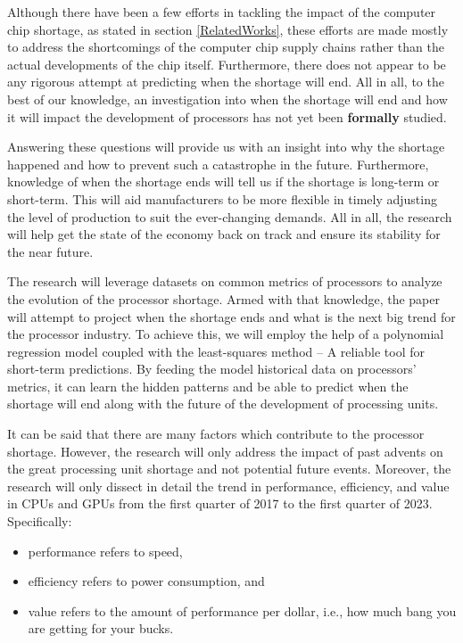 \documentclass[conference]{IEEEtran}
\begin{document}
Although there have been a few efforts in tackling the impact of the
computer chip shortage, as stated in section \ref{RelatedWorks}, these
efforts are made mostly to address the shortcomings of the computer chip
supply chains rather than the actual developments of the chip itself.
Furthermore, there does not appear to be any rigorous attempt at predicting
when the shortage will end. All in all, to the
best of our knowledge, an investigation into when the shortage will end and how
it will impact the development of processors has not yet been \textbf{formally}
studied.

Answering these questions will provide us with an insight into why the
shortage happened and how to prevent such a catastrophe in the future.
Furthermore, knowledge of when the shortage ends will tell us if the
shortage is long-term or short-term. This will aid manufacturers to be
more flexible in timely adjusting the level of production to suit the
ever-changing demands. All in all, the research will help get the state
of the economy back on track and ensure its stability for the near future.

The research will leverage datasets on common metrics of processors to
analyze the evolution of the processor shortage. Armed with that knowledge,
the paper will attempt to project when the shortage ends and what is the
next big trend for the processor industry. To achieve this, we will employ
the help of a polynomial regression model coupled with the least-squares method
-- A reliable tool for short-term predictions. By feeding the model historical
data on processors' metrics, it can learn the hidden patterns and be able to
predict when the shortage will end along with the future of the development
of processing units.

It can be said that there are many factors which contribute to the
processor shortage. However, the research will only
address the impact of past advents on the great processing unit
shortage and not potential future events. Moreover, the research will only
dissect in detail the trend in
performance, efficiency, and value in CPUs and GPUs from the first quarter of
2017 to the first quarter of 2023. Specifically:
\begin{itemize}
	\item performance refers to speed,
	\item efficiency refers to power consumption, and
	\item value refers to the amount of performance per dollar, i.e.,
	      how much bang you are getting for your bucks.
\end{itemize}
\end{document}

